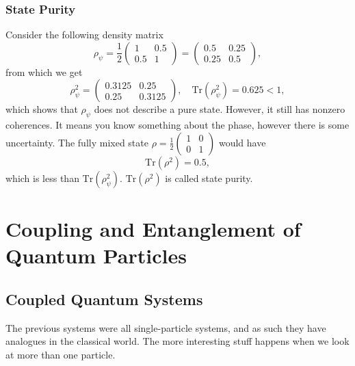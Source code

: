\documentclass{article}
\begin{document}
\subsubsection{State Purity}
Consider the following density matrix
\[
    \rho _{\psi }=\frac{1}{2}\begin{pmatrix}
        1 & 0.5 \\ 0.5 & 1
    \end{pmatrix} =\begin{pmatrix}
        0.5 & 0.25 \\ 0.25 & 0.5
    \end{pmatrix},
\]
from which we get
\[
    \rho _{\psi }^2=\begin{pmatrix}
        0.3125 & 0.25 \\ 0.25 & 0.3125
    \end{pmatrix},\quad \text{Tr}\left( \rho _{\psi }^2 \right)=0.625<1,
\]
which shows that $\rho _{\psi }$ does not describe a pure state. However, it still has nonzero coherences. It means you know something about the phase, however there is some uncertainty. The fully mixed state $\rho =\frac{1}{2}\begin{pmatrix}
    1 & 0 \\ 0 & 1
\end{pmatrix}$ would have
\[
    \text{Tr}(\rho^2)=0.5,
\]
which is less than $\text{Tr}\left( \rho _{\psi }^2 \right)$. $\text{Tr}(\rho ^2)$ is called state purity.

\section{Coupling and Entanglement of Quantum Particles}
\subsection{Coupled Quantum Systems}
The previous systems were all single-particle systems, and as such they have analogues in the classical world. The more interesting stuff happens when we look at more than one particle.
\end{document}
